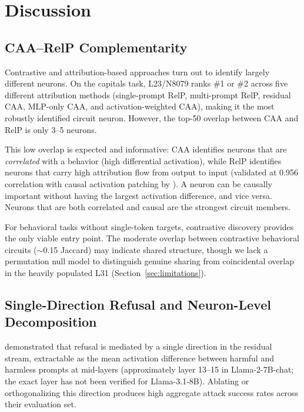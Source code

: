 \documentclass[11pt]{article}
\begin{document}
\section{Discussion}
\label{sec:discussion}

\subsection{CAA--RelP Complementarity}

Contrastive and attribution-based approaches turn out to identify largely different neurons.
On the capitals task, L23/N8079 ranks \#1 or \#2 across five different attribution methods (single-prompt RelP, multi-prompt RelP, residual CAA, MLP-only CAA, and activation-weighted CAA), making it the most robustly identified circuit neuron.
However, the top-50 overlap between CAA and RelP is only 3--5 neurons.

This low overlap is expected and informative: CAA identifies neurons that are \emph{correlated} with a behavior (high differential activation), while RelP identifies neurons that carry high attribution flow from output to input (validated at 0.956 correlation with causal activation patching by \citet{jafari2025relp}).
A neuron can be causally important without having the largest activation difference, and vice versa.
Neurons that are both correlated and causal are the strongest circuit members.

For behavioral tasks without single-token targets, contrastive discovery provides the only viable entry point.
The moderate overlap between contrastive behavioral circuits (${\sim}$0.15 Jaccard) may indicate shared structure, though we lack a permutation null model to distinguish genuine sharing from coincidental overlap in the heavily populated L31 (Section~\ref{sec:limitations}).

\subsection{Single-Direction Refusal and Neuron-Level Decomposition}

\citet{arditi2024refusal} demonstrated that refusal is mediated by a single direction in the residual stream, extractable as the mean activation difference between harmful and harmless prompts at mid-layers (approximately layer 13--15 in Llama-2-7B-chat; the exact layer has not been verified for Llama-3.1-8B).
Ablating or orthogonalizing this direction produces high aggregate attack success rates across their evaluation set.
\end{document}
